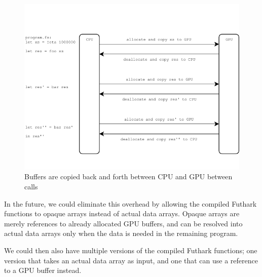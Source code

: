 \begin{figure}[H]
  \centering
  \includegraphics[scale=1.15]{chapters/figs/witharraycopying.pdf}
  \caption{Buffers are copied back and forth between CPU and GPU between calls}
  \label{fig:witharraycopying}
\end{figure}


In the future, we could eliminate this overhead by allowing the compiled Futhark functions
to opaque arrays instead of actual data arrays. Opaque arrays are merely
references to already allocated GPU buffers, and can be resolved into actual
data arrays only when the data is needed in the remaining program. 

We could then also have multiple versions of the compiled Futhark functions; one
version that takes an actual data array as input, and one that can use a
reference to a GPU buffer instead.


